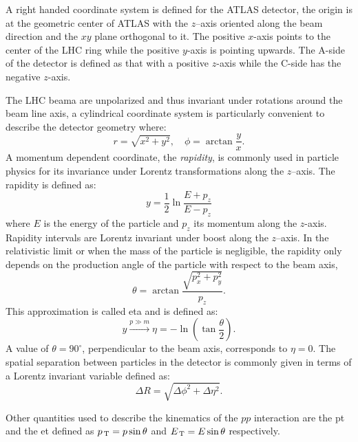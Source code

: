 A right handed coordinate system is defined for the ATLAS detector, the origin
is at the geometric center of ATLAS with the $z$--axis oriented along the beam
direction and the $xy$ plane orthogonal to it. The positive $x$-axis points to
the center of the LHC ring while the positive $y$-axis is pointing upwards. The
A-side of the detector is defined as that with a positive $z$-axis while the
C-side has the negative $z$-axis.

The LHC beama are unpolarized and thus invariant under rotations around the beam
line axis, a cylindrical coordinate system is particularly convenient to
describe the detector geometry where:
\begin{equation}
  \label{eq:73}
  r = \sqrt{x^2 + y^2}, \quad \phi = \arctan \frac{y}{x}.
\end{equation}
A momentum dependent coordinate, the \emph{rapidity}, is commonly used in
particle physics for its invariance under Lorentz transformations along the
$z$--axis. The rapidity is defined as:
\begin{equation}
  \label{eq:74}
  y = \frac{1}{2} \ln \frac{E + p_z}{E - p_z}
\end{equation}
where $E$ is the energy of the particle and $p_z$ its momentum along the
$z$-axis. Rapidity intervals are Lorentz invariant under boost along the
$z$--axis. In the relativistic limit or when the mass of the particle is
negligible, the rapidity only depends on the production angle of the particle
with respect to the beam axis,
\begin{equation}
  \label{eq:75}
  \theta = \arctan \frac{\sqrt{p_x^2 + p_y^2}}{p_z}.
\end{equation}
This approximation is called \gls{eta} and is defined as:
\begin{equation}
  \label{eq:76}
  y \xrightarrow{p \gg m} \eta = - \ln \left( \tan \frac{\theta}{2} \right).
\end{equation}
A value of $\theta = 90^{\circ}$, perpendicular to the beam axis, corresponds to
$\eta = 0$. The spatial separation between particles in the detector is commonly
given in terms of a Lorentz invariant variable defined as:
\begin{equation}
  \label{eq:77}
  \Delta R = \sqrt{\Delta \phi^2 + \Delta \eta^2}.
\end{equation}

Other quantities used to describe the kinematics of the $pp$ interaction are the
\gls{pt} and the \gls{et} defined as $p_\mathrm{\, T} = p \sin \theta$ and
$E_\mathrm{\, T} = E \sin \theta$ respectively.
